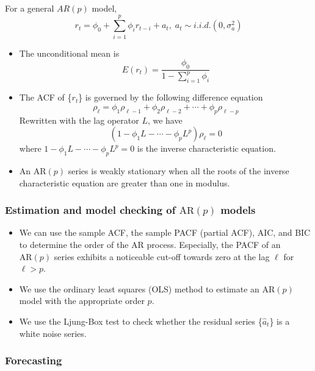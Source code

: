 \documentclass[a4paper,11pt]{article}
\begin{document}
For a general \(AR(p)\) model,
\begin{equation}
\label{eq-arp}
r_t = \phi_0 + \sum_{i=1}^p \phi_i r_{t-i} + a_t,\; a_t \sim i.i.d.(0, \sigma^2_a)
\end{equation}

\begin{itemize}
\item The unconditional mean is
\[ E(r_t) = \frac{\phi_0}{1 - \sum_{i=1}^p \phi_i} \]

\item The ACF of \{\(r_t\)\} is governed by the following difference equation
\[ \rho_{\ell} = \phi_1 \rho_{\ell-1} + \phi_2 \rho_{\ell-2} +
  \cdots + \phi_p \rho_{\ell-p} \]
Rewritten with the lag operator \(L\), we have
\[ (1 - \phi_1 L - \cdots - \phi_p L^p) \rho_{\ell} = 0 \]
where \(1 - \phi_1 L - \cdots - \phi_p L^p=0\) is the inverse
characteristic equation.

\item An \(\mathrm{AR}(p)\) series is weakly stationary when all the roots
of the inverse characteristic equation are greater than one in
modulus.
\end{itemize}

\subsubsection*{Estimation and model checking of \(\mathrm{AR}(p)\) models}
\label{sec:org3a68f9e}

\begin{itemize}
\item We can use the sample ACF, the sample PACF (partial ACF), AIC, and BIC to determine the order of the
AR process. Especially, the PACF of an \(\mathrm{AR}(p)\) series exhibits a
noticeable cut-off towards zero at the lag \(\ell\) for \(\ell > p\).

\item We use the ordinary least squares (OLS) method to estimate an
\(\mathrm{AR}(p)\) model with the appropriate order \(p\).

\item We use the Ljung-Box test to check whether the residual series
\{\(\hat{a}_t\)\} is a white noise series.
\end{itemize}

\subsubsection*{Forecasting}
\label{sec:org5358beb}
\end{document}
